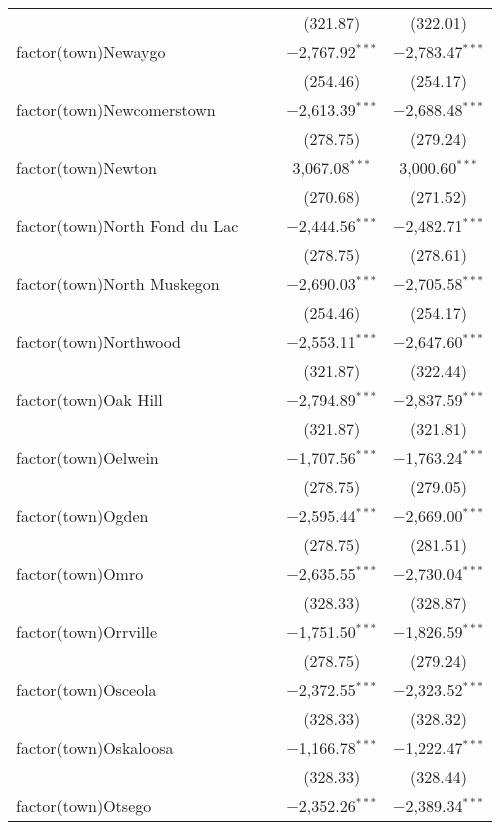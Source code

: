 \begin{table}[!htbp]
\begin{tabular}{@{\extracolsep{5pt}}lcccc}
  &  &  & (321.87) & (322.01) \\ 
  factor(town)Newaygo &  &  & $-$2,767.92$^{***}$ & $-$2,783.47$^{***}$ \\ 
  &  &  & (254.46) & (254.17) \\ 
  factor(town)Newcomerstown &  &  & $-$2,613.39$^{***}$ & $-$2,688.48$^{***}$ \\ 
  &  &  & (278.75) & (279.24) \\ 
  factor(town)Newton &  &  & 3,067.08$^{***}$ & 3,000.60$^{***}$ \\ 
  &  &  & (270.68) & (271.52) \\ 
  factor(town)North Fond du Lac &  &  & $-$2,444.56$^{***}$ & $-$2,482.71$^{***}$ \\ 
  &  &  & (278.75) & (278.61) \\ 
  factor(town)North Muskegon &  &  & $-$2,690.03$^{***}$ & $-$2,705.58$^{***}$ \\ 
  &  &  & (254.46) & (254.17) \\ 
  factor(town)Northwood &  &  & $-$2,553.11$^{***}$ & $-$2,647.60$^{***}$ \\ 
  &  &  & (321.87) & (322.44) \\ 
  factor(town)Oak Hill &  &  & $-$2,794.89$^{***}$ & $-$2,837.59$^{***}$ \\ 
  &  &  & (321.87) & (321.81) \\ 
  factor(town)Oelwein &  &  & $-$1,707.56$^{***}$ & $-$1,763.24$^{***}$ \\ 
  &  &  & (278.75) & (279.05) \\ 
  factor(town)Ogden &  &  & $-$2,595.44$^{***}$ & $-$2,669.00$^{***}$ \\ 
  &  &  & (278.75) & (281.51) \\ 
  factor(town)Omro &  &  & $-$2,635.55$^{***}$ & $-$2,730.04$^{***}$ \\ 
  &  &  & (328.33) & (328.87) \\ 
  factor(town)Orrville &  &  & $-$1,751.50$^{***}$ & $-$1,826.59$^{***}$ \\ 
  &  &  & (278.75) & (279.24) \\ 
  factor(town)Osceola &  &  & $-$2,372.55$^{***}$ & $-$2,323.52$^{***}$ \\ 
  &  &  & (328.33) & (328.32) \\ 
  factor(town)Oskaloosa &  &  & $-$1,166.78$^{***}$ & $-$1,222.47$^{***}$ \\ 
  &  &  & (328.33) & (328.44) \\ 
  factor(town)Otsego &  &  & $-$2,352.26$^{***}$ & $-$2,389.34$^{***}$ \\ 

\end{tabular}
\end{table}
